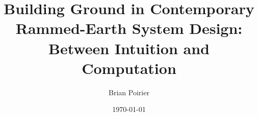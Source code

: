 \documentclass{article}
\begin{document}
\title{Building Ground in Contemporary Rammed-Earth System Design: Between Intuition and Computation}
\author{Brian Poirier}
\date{\today}
\maketitle
\clearpage



% 


\clearpage

\printbibliography
\end{document}
